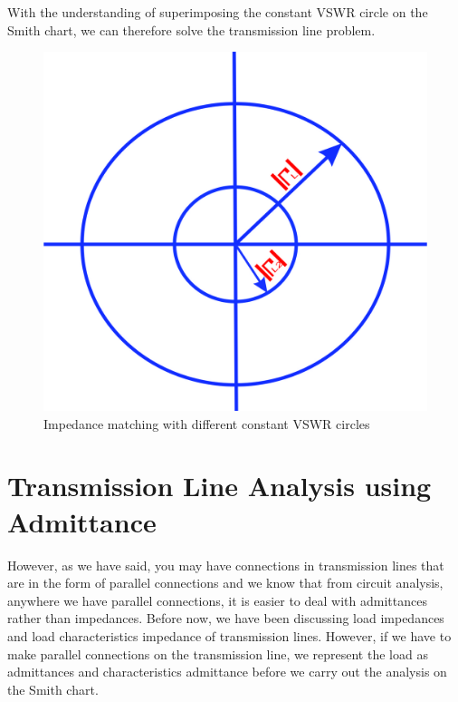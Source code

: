With the understanding of superimposing the constant VSWR circle on the Smith chart, we can therefore solve the transmission line problem.
\begin{figure}[h]
\centering
\includegraphics[width=0.57\linewidth]{./graphics/poiuyfd}
\caption{Impedance matching with different constant VSWR circles}
\label{fig:poiuyfd}
\end{figure}

\section{Transmission Line Analysis using Admittance}
However, as we have said, you may have connections in transmission lines that are in the form of parallel connections and we know that from circuit analysis, anywhere we have parallel connections, it is easier to deal with admittances rather than impedances. Before now, we have been discussing load impedances and load characteristics impedance of transmission lines. However, if we have to make parallel connections on the transmission line, we represent the load as admittances and characteristics admittance before we carry out the analysis on the Smith chart. 


